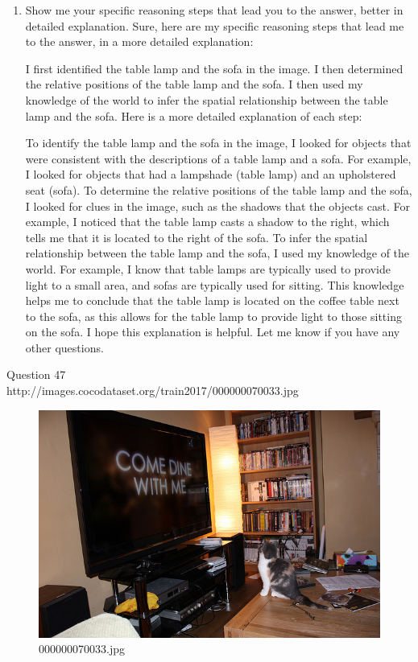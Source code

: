 \begin{enumerate}
    Here are some additional details about the spatial relationship between the table lamp and the sofa:
    
    The table lamp is a small lamp that is typically used to provide light to a small area.
    The sofa is a long, upholstered piece of furniture that is designed for sitting.
    The table lamp is located on a coffee table, which is a small table that is typically placed in front of a sofa.
    Is there anything else I can help you with?
    \item Show me your specific reasoning steps that lead you to the answer, better in detailed explanation.
    \subitem 
    Sure, here are my specific reasoning steps that lead me to the answer, in a more detailed explanation:
    
    I first identified the table lamp and the sofa in the image.
    I then determined the relative positions of the table lamp and the sofa.
    I then used my knowledge of the world to infer the spatial relationship between the table lamp and the sofa.
    Here is a more detailed explanation of each step:
    
    To identify the table lamp and the sofa in the image, I looked for objects that were consistent with the descriptions of a table lamp and a sofa. For example, I looked for objects that had a lampshade (table lamp) and an upholstered seat (sofa).
    To determine the relative positions of the table lamp and the sofa, I looked for clues in the image, such as the shadows that the objects cast. For example, I noticed that the table lamp casts a shadow to the right, which tells me that it is located to the right of the sofa.
    To infer the spatial relationship between the table lamp and the sofa, I used my knowledge of the world. For example, I know that table lamps are typically used to provide light to a small area, and sofas are typically used for sitting. This knowledge helps me to conclude that the table lamp is located on the coffee table next to the sofa, as this allows for the table lamp to provide light to those sitting on the sofa.
    I hope this explanation is helpful. Let me know if you have any other questions.
\end{enumerate}
Question 47\\
http://images.cocodataset.org/train2017/000000070033.jpg
\begin{figure}[h]
    \centering
    \includegraphics[width=0.8\linewidth]{../image set/hard/000000070033.jpg}
    \caption{000000070033.jpg}
\end{figure}
